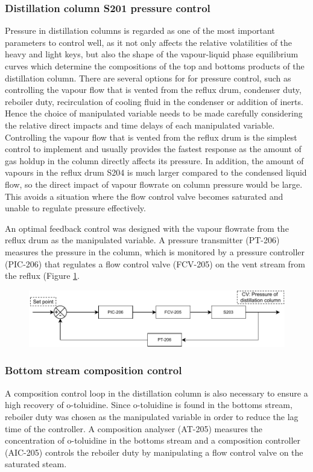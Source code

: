 \subsubsection{Distillation column S201 pressure control}
Pressure in distillation columns is regarded as one of the most important parameters to control well, as it not only affects the relative volatilities of the heavy and light keys, but also the shape of the vapour-liquid phase equilibrium curves which determine the compositions of the top and bottoms products of the distillation column. There are several options for for pressure control, such as controlling the vapour flow that is vented from the reflux drum, condenser duty, reboiler duty, recirculation of cooling fluid in the condenser or addition of inerts. Hence the choice of manipulated variable needs to be made carefully considering the relative direct impacts and time delays of each manipulated variable. Controlling the vapour flow that is vented from the reflux drum is the simplest control to implement and usually provides the fastest response as the amount of gas holdup in the column directly affects its pressure. In addition, the amount of vapours in the reflux drum S204 is much larger compared to the condensed liquid flow, so the direct impact of vapour flowrate on column pressure would be large. This avoids a situation where the flow control valve becomes saturated and unable to regulate pressure effectively. 

An optimal feedback control was designed with the vapour flowrate from the reflux drum as the manipulated variable. A pressure transmitter (PT-206) measures the pressure in the column, which is monitored by a pressure controller (PIC-206) that regulates a flow control valve (FCV-205) on the vent stream from the reflux (Figure \ref{fig:S203-PC}.

\begin{figure}[H]
    \centering
    \includegraphics[width=\linewidth]{chapters/4-operation-control/4-Figures/S203-PC.pdf}
    \caption{}
    \label{fig:S203-PC}
\end{figure}

\subsubsection{Bottom stream composition control}
A composition control loop in the distillation column is also necessary to ensure a high recovery of o-toluidine. Since o-toluidine is found in the bottoms stream, reboiler duty was chosen as the manipulated variable in order to reduce the lag time of the controller. A composition analyser (AT-205) measures the concentration of o-toluidine in the bottoms stream and a composition controller (AIC-205) controls the reboiler duty by manipulating a flow control valve on the saturated steam. 

